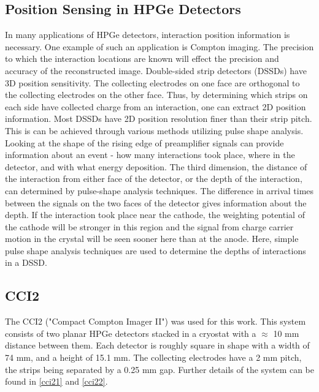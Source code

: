\subsection*{Position Sensing in HPGe Detectors}

In many applications of HPGe detectors, interaction position information is necessary. One example of such an application is Compton imaging. The precision to which the interaction locations are known will effect the precision and accuracy of the reconstructed image.
Double-sided strip detectors (DSSDs) have 3D position sensitivity. The collecting electrodes on one face are orthogonal to the collecting electrodes on the other face. Thus, by determining which strips on each side have collected charge from an interaction, one can extract 2D position information. Most DSSDs have 2D position resolution finer than their strip pitch. This is can be achieved through various methods utilizing pulse shape analysis. Looking at the shape of the rising edge of preamplifier signals can provide information about an event - how many interactions took place, where in the detector, and with what energy deposition. 
The third dimension, the distance of the interaction from either face of the detector, or the depth of the interaction, can determined by pulse-shape analysis techniques. The difference in arrival times between the signals on the two faces of the detector gives information about the depth. If the interaction took place near the cathode, the weighting potential of the cathode will be stronger in this region and the signal from charge carrier motion in the crystal will be seen sooner here than at the anode. Here, simple pulse shape analysis techniques are used to determine the depths of interactions in a DSSD.

\subsection*{CCI2}

The CCI2 ("Compact Compton Imager II") was used for this work. This system consists of two planar HPGe detectors stacked in a cryostat with a $\approx$ 10 mm distance between them. Each detector is roughly square in shape with a width of 74 mm, and a height of 15.1 mm. The collecting electrodes have a 2 mm pitch, the strips being separated by a 0.25 mm gap. Further details of the system can be found in \ref{cci21} and \ref{cci22}.